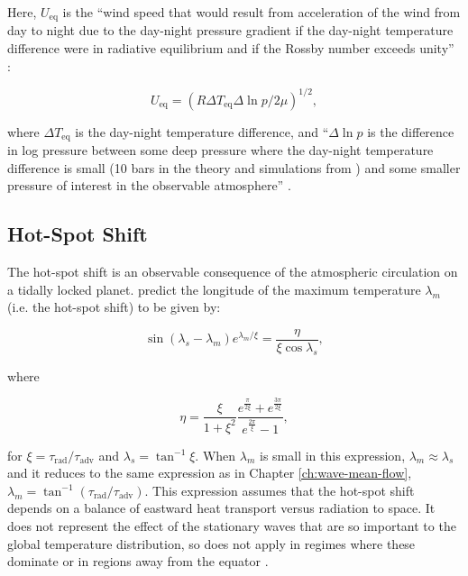 Here, $U_{\mathrm{eq}}$ is the ``wind speed that would result
from acceleration of the wind from day to night due to the day-night pressure gradient if the day-night temperature difference
were in radiative equilibrium and if the Rossby number exceeds
unity'' \citep{zhang2017dynamics}:

\begin{equation}
  U_{\mathrm{eq}}=\left(R \Delta T_{\mathrm{eq}} \Delta \ln p / 2 \mu\right)^{1 / 2},
\end{equation}

where $\Delta T_{\mathrm{eq}}$ is the day-night temperature difference, and ``$ \Delta \ln p$ is the difference in log
pressure between some deep pressure where the day-night
temperature difference is small (10 bars in the theory and
simulations from \citet{komacek2016daynightI}) and some
smaller pressure of interest in the observable atmosphere'' \citep{zhang2017dynamics}.



\subsection{Hot-Spot Shift}\label{sec:hot-spot-shift}

The hot-spot shift is an observable consequence of the atmospheric circulation on a tidally locked planet. \citet{zhang2017dynamics} predict the longitude of the maximum temperature $\lambda_{m}$ (i.e. the hot-spot shift) to be given by:

\begin{equation}\label{eqn:zhang-hss}
  \sin \left(\lambda_{s}-\lambda_{m}\right) e^{\lambda_{m} / \xi}=\frac{\eta}{\xi \cos \lambda_{s}},
\end{equation}

where

\begin{equation}
  \eta=\frac{\xi}{1+\xi^{2}} \frac{e^{\frac{\pi}{2 \xi}}+e^{\frac{3 \pi}{2 \xi}}}{e^{\frac{2 \pi}{\xi}}-1},
\end{equation}

for $\xi=\tau_{\mathrm{rad}} / \tau_{\mathrm{adv}}$ and $\lambda_{s}=\tan ^{-1} \xi$. When $\lambda_{m}$ is small in this expression, $\lambda_{m} \approx \lambda_{s}$ and it reduces to the same expression as in Chapter \ref{ch:wave-mean-flow}, $\lambda_{m}=\tan ^{-1} (\tau_{\mathrm{rad}} / \tau_{\mathrm{adv}})$. This expression assumes that the hot-spot shift depends on a balance of eastward heat transport versus radiation to space. It does not represent the effect of the stationary waves that are so important to the global temperature distribution, so does not apply in regimes where these dominate or in regions away from the equator \citep{perez2013atmospheric, hammond2018wavemean}.


